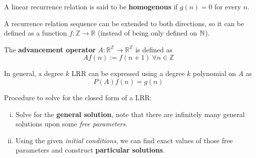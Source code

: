 \documentclass{article}
\def\Z{{\mathbb Z}}
\def\R{{\mathbb R}}
\begin{document}
				\begin{definition}
					A linear recurrence relation is said to be \textbf{homogenous} if $g(n) = 0$ for every $n$.
				\end{definition}
				
				\begin{remark}
					A recurrence relation sequence can be extended to both directions, so it can be defined as a function $f: \Z \to \R$ (instead of being only defined on $\mathbb{N}$).
				\end{remark}
				
				\begin{definition}
					The \textbf{advancement operator} $A: \R^{\Z} \to \R^{\Z}$ is defined as
					\begin{equation}
						A f(n) := f(n+1)\ \forall n \in \Z
					\end{equation}
				\end{definition}
				
				\begin{proposition}
					In general, a degree $k$ LRR can be expressed using a degree $k$ polynomial on $A$ as
					\begin{equation}
						P(A) f(n) = g(n)
					\end{equation}
				\end{proposition}
				
				\begin{remark}Procedure to solve for the closed form of a LRR:
					\begin{enumerate}[(i)]
						\item Solve for the \textbf{general solution}, note that there are infinitely many general solutions upon some \emph{free parameters}.
						\item Using the given \emph{initial conditions}, we can find exact values of those free parameters and construct \textbf{particular solutions}.
					\end{enumerate}
				\end{remark}
				
\end{document}
